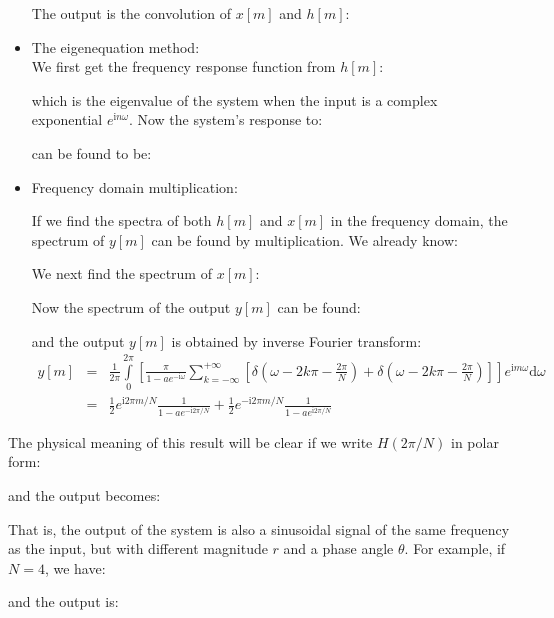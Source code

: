 \begin{tcolorbox}[colframe=black,colback=white,sharp corners,breakable]
\begin{itemize}
		The output is the convolution of $x[m]$ and $h[m]$:
		
		
		\item The eigenequation method:\\ 
	
		We first get the frequency response function from $h[m]$:
		
		which is the eigenvalue of the system when the input is a complex exponential $e^{\mathrm{i}n\omega}$. Now the system's response to: 
		
		can be found to be:
		
	\end{itemize}
	
	\begin{itemize}
		\item Frequency domain multiplication:
		
		If we find the spectra of both $h[m]$ and $x[m]$ in the frequency domain, the spectrum of $y[m]$ can be found by multiplication. We already know:
		
		We next find the spectrum of $x[m]$:
		
		Now the spectrum of the output $y[m]$ can be found:
		
		and the output $y[m]$ is obtained by inverse Fourier transform:
		\begin{eqnarray}
		y[m] &=& \frac{1}{2\pi} \int\limits_0^{2\pi} \left[\frac{\pi}{1-ae^{-\mathrm{i} \omega}}
		 \sum_{k=-\infty}^{+\infty} \left[\delta\left(\omega-2k\pi-\frac{2\pi}{N}\right)+\delta\left(\omega-2k\pi-\frac{2\pi}{N}\right)\right]\right]
			e^{\mathrm{i}m\omega} \mathrm{d}\omega
			\nonumber \\
		 &=& \frac{1}{2}e^{\mathrm{i}2\pi m/N}\frac{1}{1-ae^{-\mathrm{i}2\pi /N}}
			+\frac{1}{2}e^{-\mathrm{i}2\pi m/N}\frac{1}{1-ae^{\mathrm{i}2\pi /N}}	
			\nonumber
		\end{eqnarray}
	\end{itemize}
	
	The physical meaning of this result will be clear if we write $H(2\pi/N)$ in polar form:
	
	and the output becomes:
	
	That is, the output of the system is also a sinusoidal signal of the same 
	frequency as the input, but with different magnitude $r$ and a phase angle
	$\theta$. For example, if $N=4$, we have:
	
	and the output is:
	
	\end{tcolorbox}
	
